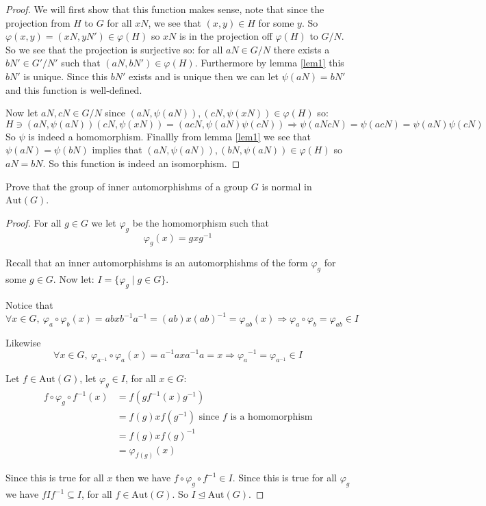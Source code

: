 \begin{exercise}
\begin{proof}
We will first show that this function makes sense, note that since the projection from $H$ to $G$ for all $xN$, we see that $(x,y)\in H$ for some $y$. So $\varphi(x,y) = (xN,yN')\in \varphi(H)$ so $xN$ is in the projection off $\varphi(H)$ to $G/N$. So we see that the projection is surjective so: 
for all $aN\in G/N$ there exists a $bN'\in G'/N'$ such that $(aN,bN')\in \varphi(H)$. Furthermore by lemma \ref{lem1} this $bN'$ is unique. Since this $bN'$ exists and is unique then we can let $\psi(aN) = bN'$ and this function is well-defined.

Now let $aN,cN\in G/N$ since $(aN, \psi(aN)),(cN,\psi(xN)) \in \varphi(H)$ so:\begin{equation*}
H \ni (aN, \psi(aN))(cN,\psi(xN)) = (acN, \psi(aN)\psi(cN)) \Rightarrow \psi(aNcN) = \psi(acN) = \psi(aN)\psi(cN)
\end{equation*} 
So $\psi$ is indeed a homomorphism. Finallly from lemma \ref{lem1} we see that $\psi(aN) = \psi(bN)$ implies that $(aN,\psi(aN)),(bN,\psi(aN))\in \varphi(H)$ so $aN=bN$. So this function is indeed an isomorphism.
\end{proof}
\end{exercise}

\begin{exercise}
Prove that the group of inner automorphishms of a group $G$ is normal in $\text{Aut}(G)$.
\begin{proof}
For all $g\in G$ we let $\varphi_g$ be the homomorphism such that \[\varphi_g(x) = gxg^{-1}\]

Recall that an inner automorphishms is an automorphishms of the form $\varphi_g$ for some $g\in G$. Now let: $I = \{\varphi_g \mid g\in G\}$.

Notice that \[\forall x\in G, \ \varphi_a\circ\varphi_b(x) = abxb^{-1}a^{-1} = (ab)x{(ab)}^{-1} = \varphi_{ab}(x)\Rightarrow \varphi_a\circ\varphi_b = \varphi_{ab}\in I \]

Likewise \[\forall x\in G, \ \varphi_{a^{-1}}\circ\varphi_a(x) = a^{-1}axa^{-1}a = x\Rightarrow {\varphi_a}^{-1} = \varphi_{a^{-1}}\in I \]

Let $f\in \text{Aut}(G)$, let $\varphi_g\in I$, for all $x\in G$:\begin{align*}
f\circ\varphi_g\circ f^{-1}(x) &= f(gf^{-1}(x)g^{-1})\\
           &= f(g)xf(g^{-1}) \text{ since }f\text{ is a homomorphism}\\
           &= f(g)x{f(g)}^{-1}\\
           &= \varphi_{f(g)}(x)
\end{align*}

Since this is true for all $x$ then we have $f\circ\varphi_g\circ f^{-1} \in I$. Since this is true for all $\varphi_g$ we have $fIf^{-1} \subseteq I$, for all $f\in \text{Aut}(G)$. So $I\trianglelefteq \text{Aut}(G)$.


\end{proof}
\end{exercise}

